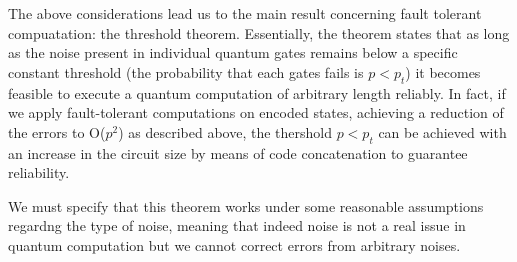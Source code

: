 \documentclass[12pt]{report}
\begin{document}
\begin{minipage}{1 \textwidth}
		
	
        
	    The above considerations lead us to the main result concerning fault tolerant compuatation: the threshold theorem. Essentially, the theorem states that as long as the noise present in individual quantum gates remains below a specific constant threshold (the probability that each gates fails is $p<p_t$) it becomes feasible to execute a quantum computation of arbitrary length reliably. In fact, if we apply fault-tolerant computations on encoded states, achieving a reduction of the errors to O($p^2$) as described above, the thershold $p<p_t$ can be achieved with an increase in the circuit size by means of code concatenation to guarantee reliability.\newline
	    
		
		
		
	\end{minipage}
	
	\begin{minipage}{1 \textwidth}
		
		We must specify that this theorem works under some reasonable assumptions regardng the type of noise, meaning that indeed noise is not a real issue in quantum computation but we cannot correct errors from arbitrary noises.
		
	\end{minipage}
	
	\begin{minipage}{1 \textwidth}
		
	\end{minipage}
	
	
	
	
	
	\begin{minipage}{1 \textwidth}
	
	\end{minipage}
	
\end{document}
